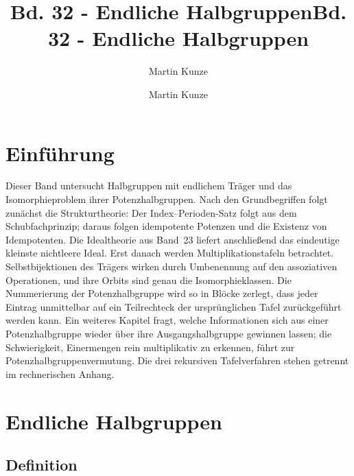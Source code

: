 \documentclass[main.tex]{subfiles}
\title{Bd. 32 - Endliche Halbgruppen}
\author{Martin Kunze}
\date{}
\begin{document}
\title{Bd. 32 - Endliche Halbgruppen}
\author{Martin Kunze}
\date{}
\hypersetup{pageanchor=false}
\maketitle
\hypersetup{pageanchor=true}
\setcounter{tocdepth}{3}
\tableofcontents
\setcounter{file}{32}
\renewcommand{\FormulaBandID}{32}

\chapter{Einführung}

Dieser Band untersucht Halbgruppen mit endlichem Träger und das
Isomorphieproblem ihrer Potenzhalbgruppen.  Nach den Grundbegriffen folgt
zunächst die Strukturtheorie: Der Index--Perioden-Satz folgt aus dem
Schubfachprinzip; daraus folgen idempotente
Potenzen und die Existenz von Idempotenten.  Die Idealtheorie aus Band~23
liefert anschließend das eindeutige kleinste nichtleere Ideal.  Erst danach
werden Multiplikationstafeln betrachtet.  Selbstbijektionen des Trägers
wirken durch Umbenennung auf den assoziativen Operationen, und ihre Orbits
sind genau die Isomorphieklassen.  Die Nummerierung der Potenzhalbgruppe wird
so in Blöcke zerlegt, dass jeder Eintrag unmittelbar auf ein Teilrechteck
der ursprünglichen Tafel zurückgeführt werden kann.  Ein weiteres Kapitel
fragt, welche Informationen sich aus einer Potenzhalbgruppe wieder über
ihre Ausgangshalbgruppe gewinnen lassen; die Schwierigkeit, Einermengen rein
multiplikativ zu erkennen, führt zur Potenzhalbgruppenvermutung.  Die drei
rekursiven Tafelverfahren stehen getrennt im rechnerischen Anhang.

\chapter{Endliche Halbgruppen}

\section{Definition}

\end{document}
